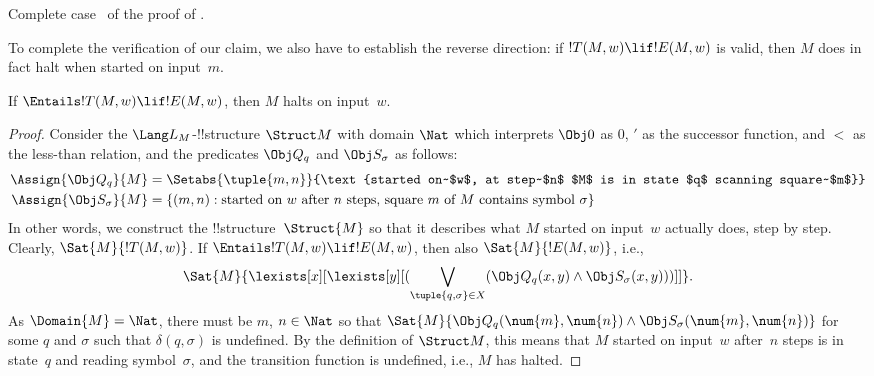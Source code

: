 \documentclass[../../../include/open-logic-section]{subfiles}
\begin{document}
\begin{prob}
Complete case~ of the proof of
.
\end{prob}

\begin{explain} 
To complete the verification of our claim, we also have to
establish the reverse direction: if $!T(M, w) \lif !E(M, w)$ is valid, then
$M$ does in fact halt when started on input~$m$. 
\end{explain}

\begin{lem}
If $\Entails !T(M, w) \lif !E(M, w)$, then $M$ halts on input~$w$.
\end{lem}

\begin{proof} 
Consider the $\Lang L_M$-!!{structure} $\Struct M$ with
domain $\Nat$ which interprets $\Obj 0$ as $0$, $'$ as the successor
function, and $<$ as the less-than relation, and the predicates $\Obj Q_q$
and $\Obj S_\sigma$ as follows:
\begin{align*}
  \Assign{\Obj Q_q}{M} & =
\Setabs{\tuple{m, n}}{\text{started on~$w$, at step~$n$ $M$ is in state $q$
  scanning square~$m$}} \\
\Assign{\Obj S_\sigma}{M} & = \{(m, n) :
\text{started on~$w$ after $n$ steps, square~$m$ of $M$ contains
  symbol~$\sigma$}\}
\end{align*}
In other words, we construct the !!{structure}~$\Struct{M}$ so that it
describes what $M$ started on input~$w$ actually does, step by step.
Clearly, $\Sat{M}{!T(M, w)}$. If $\Entails !T(M, w) \lif !E(M, w)$,
then also $\Sat{M}{!E(M, w)}$, i.e.,
\[
\Sat{M}{\lexists[x][\lexists[y][(\bigvee_{\tuple{q, \sigma} \in
      X}(\Obj Q_q(x, y) \land \Obj S_\sigma(x, y)))]]}.
\]
As $\Domain{M} = \Nat$, there must be $m$, $n \in \Nat$ so that
$\Sat{M}{\Obj Q_q(\num{m}, \num{n}) \land \Obj S_\sigma(\num{m},
  \num{n})}$ for some $q$ and $\sigma$ such that $\delta(q, \sigma)$
is undefined. By the definition of $\Struct M$, this means that $M$
started on input~$w$ after~$n$ steps is in state~$q$ and reading
symbol~$\sigma$, and the transition function is undefined, i.e., $M$
has halted.
\end{proof}
\end{document}
